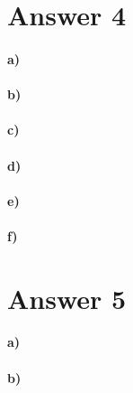 \documentclass[12pt]{article}
\newcommand\+{\mkern2mu}
\begin{document}
\section*{Answer 4}
\paragraph{a)} %
\paragraph{b)} %
\paragraph{c)}
\paragraph{d)}
\paragraph{e)}
\paragraph{f)}

\section*{Answer 5}
\paragraph{a)}
\paragraph{b)}
\end{document}
